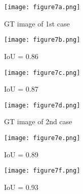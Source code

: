 \begin{sloppypar}
\begin{table}[]
\begin{tabular}{llc}
		\end{tabular}
		\label{tab:meanIoU_vs_input}
	\end{table}
	\begin{figure} [!ht]
		\centering
		\begin{subfigure}[b]{0.32\textwidth}
			\centering
			\texttt{[image: figure7a.png]}
			\caption{GT image of 1st case}
			\label{fig:num_GT_391}
		\end{subfigure}
		\hfill
		\begin{subfigure}[b]{0.32\textwidth}
			\centering
			\texttt{[image: figure7b.png]} 
			\caption{IoU = 0.86}
			\label{fig:Convlstm_num_391}
		\end{subfigure}
		\hfill
		\begin{subfigure}[b]{0.32\textwidth}
			\centering
			\texttt{[image: figure7c.png]}
			\caption{IoU =  0.87}
			\label{fig:AE_num_391}
		\end{subfigure}
		\par\medskip
		\begin{subfigure}[b]{0.32\textwidth}
			\centering
			\texttt{[image: figure7d.png]}
			\caption{GT image of 2nd case}
			\label{fig:num_GT_462}
		\end{subfigure}
		\hfill
		\begin{subfigure}[b]{0.32\textwidth}
			\centering
			\texttt{[image: figure7e.png]}
			\caption{IoU = 0.89}
			\label{fig:Convlstm_num_462}
		\end{subfigure}
		\hfill
		\begin{subfigure}[b]{0.32\textwidth}
			\centering
			\texttt{[image: figure7f.png]}
			\caption{IoU = 0.93}
			\label{fig:AE_num_462}
		\end{subfigure}
		\par\medskip
		\begin{subfigure}[b]{0.32\textwidth}
			\centering

\end{subfigure}
\end{figure}
\end{sloppypar}
